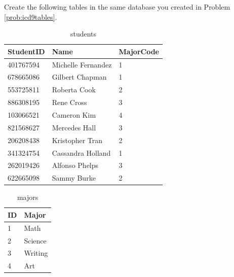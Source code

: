 \begin{problem}
Create the following tables in the same database you created in Problem \ref{prob:icd9tables}.

\begin{table}[H]
\begin{tabular}{|l|l|l|}
\hline
StudentID & Name & MajorCode \\
\hline
401767594 & Michelle Fernandez & 1 \\
678665086 & Gilbert Chapman & 1 \\
553725811 & Roberta Cook & 2 \\
886308195 & Rene Cross & 3 \\
103066521 & Cameron Kim & 4 \\
821568627 & Mercedes Hall & 3 \\
206208438 & Kristopher Tran & 2 \\
341324754 & Cassandra Holland & 1 \\
262019426 & Alfonso Phelps & 3 \\
622665098 & Sammy Burke &2 \\
\hline
\end{tabular}
\caption{students}
\end{table}

\begin{table}[H]
\begin{tabular}{|l|l|}
\hline
ID & Major \\
\hline
1 & Math \\
2 & Science \\
3 & Writing \\
4 & Art \\
\hline
\end{tabular}
\caption{majors}
\end{table}


\end{problem}
